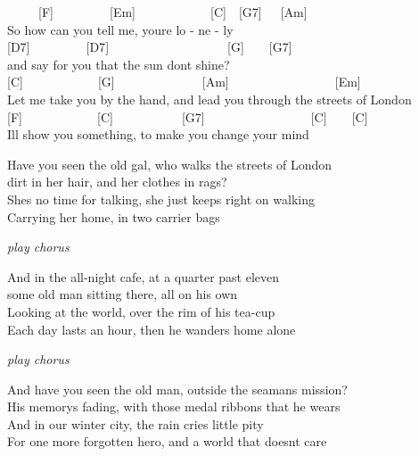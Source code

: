 \documentclass[
  letterpaper,
  a5paper]{memoir}
\begin{document}
\begin{tcolorbox}[enhanced jigsaw, breakable, bottomrule=.15mm, colframe=quarto-callout-color-frame, rightrule=.15mm, opacityback=0, colback=white, arc=.35mm, toprule=.15mm, leftrule=.75mm, left=2mm]

~~~~~{[}F{]}~~~~~~~~~{[}Em{]}~~~~~~~~~~~~{[}C{]}~~{[}G7{]}~~~{[}Am{]}\\
\hspace*{0.333em}\hspace*{0.333em}\hspace*{0.333em}\hspace*{0.333em}So
how can you tell me, you\textquotesingle re lo - ne - ly\\
{[}D7{]}~~~~~~~~~{[}D7{]}~~~~~~~~~~~~~~~~~~~{[}G{]}~~~~{[}G7{]}\\
\hspace*{0.333em}\hspace*{0.333em}and say for you that the sun
don\textquotesingle t shine?\\
{[}C{]}~~~~~~~~~~~~{[}G{]}~~~~~~~~~~~~~~{[}Am{]}~~~~~~~~~~~~~~~~~{[}Em{]}\\
Let me take you by the hand, and lead you through the streets of
London\\
{[}F{]}~~~~~~~~~~~~{[}C{]}~~~~~~~~~~~{[}G7{]}~~~~~~~~~~~~~~~~~{[}C{]}~~~~{[}C{]}\\
\hspace*{0.333em}\hspace*{0.333em}I\textquotesingle ll show you
something, to make you change your mind

\end{tcolorbox}

Have you seen the old gal, who walks the streets of London\\
dirt in her hair, and her clothes in rags?\\
She\textquotesingle s no time for talking, she just keeps right on
walking\\
Carrying her home, in two carrier bags

\emph{play chorus}

And in the all-night cafe, at a quarter past eleven\\
some old man sitting there, all on his own\\
Looking at the world, over the rim of his tea-cup\\
Each day lasts an hour, then he wanders home alone

\emph{play chorus}

And have you seen the old man, outside the seaman\textquotesingle s
mission?\\
His memory\textquotesingle s fading, with those medal ribbons that he
wears\\
And in our winter city, the rain cries little pity\\
For one more forgotten hero, and a world that doesn\textquotesingle t
care
\end{document}
